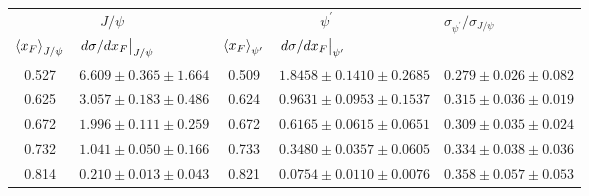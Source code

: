 \begin{tabular}{cc|cc|c}
\hline
\multicolumn{2}{c|}{$J/\psi$} &
  \multicolumn{2}{c|}{$\psi^{\prime}$} &
  \multicolumn{1}{l}{\multirow{2}{*}{$\sigma_{\psi^\prime}/\sigma_{J/\psi}$}} \\ \cline{1-4}
\multicolumn{1}{l}{$\expval{x_F}_{J/\psi}$} &
  \multicolumn{1}{l|}{$\eval{d\sigma/dx_F}_{J/\psi}$} &
  \multicolumn{1}{l}{$\expval{x_F}_{\psi^\prime}$} &
  \multicolumn{1}{l|}{$\eval{d\sigma/dx_F}_{\psi^\prime}$} &
  \multicolumn{1}{l}{} \\ \hline
\multicolumn{1}{c|}{0.527} &
  $6.609\pm0.365\pm1.664$ &
  \multicolumn{1}{c|}{0.509} &
  $1.8458\pm0.1410\pm0.2685$ &
  $0.279\pm0.026\pm0.082$ \\
\multicolumn{1}{c|}{0.625} &
  $3.057\pm0.183\pm0.486$ &
  \multicolumn{1}{c|}{0.624} &
  $0.9631\pm0.0953\pm0.1537$ &
  $0.315\pm0.036\pm0.019$ \\
\multicolumn{1}{c|}{0.672} &
  $1.996\pm0.111\pm0.259$ &
  \multicolumn{1}{c|}{0.672} &
  $0.6165\pm0.0615\pm0.0651$ &
  $0.309\pm0.035\pm0.024$ \\
\multicolumn{1}{c|}{0.732} &
  $1.041\pm0.050\pm0.166$ &
  \multicolumn{1}{c|}{0.733} &
  $0.3480\pm0.0357\pm0.0605$ &
  $0.334\pm0.038\pm0.036$ \\
\multicolumn{1}{c|}{0.814} &
  $0.210\pm0.013\pm0.043$ &
  \multicolumn{1}{c|}{0.821} &
  $0.0754\pm0.0110\pm0.0076$ &
  $0.358\pm0.057\pm0.053$ \\ \hline
\end{tabular}
